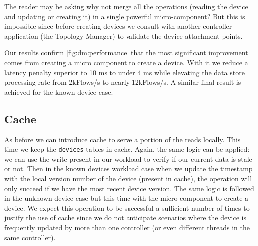 The reader may be asking why not merge all the operations (reading the device and updating or creating it) in a single powerful 
micro-component? But this is impossible since before creating devices we consult with another controller application (the Topology Manager) to validate the device attachment points. 

Our results confirm \ref{fig:dm:performance} that the most significant improvement comes from creating a micro component to create a device. With it we reduce a latency penalty superior to 10 ms to under 4 ms while elevating the data store processing rate from 2kFlows/s to nearly 12kFlows/s.  A similar final result is achieved for the known device case. 

\subsection{Cache}
As before we can introduce cache to serve a portion of the reads locally. 
This time we keep the \texttt{devices} tables in cache.  
Again, the same logic  can be applied: we can use the write present in our workload to verify if our current data is stale or not.  Then in the known devices workload case when we update the timestamp with the local version number of the device (present in cache), the operation will only succeed if we have the most recent device version. 
The same logic is followed in the unknown device case but this time with the micro-component to create a device. 
We expect this operation to be successful a sufficient number of times to justify the  use of cache since we do not anticipate scenarios where the device is frequently updated by more than one controller (or even different threads in the same controller). 


